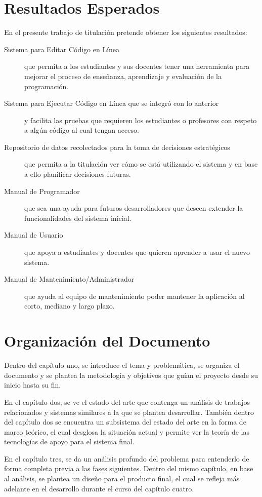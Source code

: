 \section{Resultados Esperados}
En el presente trabajo de titulación pretende obtener los siguientes resultados:
\begin{description}
	\item[Sistema para Editar Código en Línea] que permita a los estudiantes y sus docentes tener una herramienta para mejorar el proceso de enseñanza, aprendizaje y evaluación de la programación.
    \item[Sistema para Ejecutar Código en Línea que se integró con lo anterior] y facilita las pruebas que requieren los estudiantes o profesores con respeto a algún código al cual tengan acceso.
    \item[Repositorio de datos recolectados para la toma de decisiones estratégicos] que permita a la titulación ver cómo se está utilizando el sistema y en base a ello planificar decisiones futuras.
    \item[Manual de Programador] que sea una ayuda para futuros desarrolladores que deseen extender la funcionalidades del sistema inicial.
    \item[Manual de Usuario] que apoya a estudiantes y docentes que quieren aprender a usar el nuevo sistema.
    \item[Manual de Mantenimiento/Administrador] que ayuda al equipo de mantenimiento poder mantener la aplicación al corto, mediano y largo plazo.
\end{description}

\section{Organización del Documento}
Dentro del capítulo uno, se introduce el tema y problemática, se organiza el documento y se plantea la metodología y objetivos que guían el proyecto desde su inicio hasta su fin.
 
En el capítulo dos, se ve el estado del arte que contenga un análisis de trabajos relacionados y sistemas similares a la que se plantea desarrollar. También dentro del capítulo dos se encuentra un subsistema del estado del arte en la forma de marco teórico, el cual desglosa la situación actual y permite ver la teoría de las tecnologías de apoyo para el sistema final.
 
En el capítulo tres, se da un análisis profundo del problema para entenderlo de forma completa previa a las fases siguientes. Dentro del mismo capítulo, en base al análisis, se plantea un diseño para el producto final, el cual se refleja más adelante en el desarrollo durante el curso del capítulo cuatro.
 
